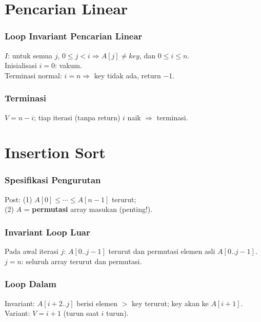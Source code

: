 \documentclass[handout]{beamer}
\theoremstyle{definition}
\theoremstyle{example}
\begin{document}
\section{Pencarian Linear}

\begin{frame}
\frametitle{Loop Invariant Pencarian Linear}
$I$: untuk semua $j$, $0 \leq j < i \Rightarrow A[j] \neq key$, dan $0 \leq i \leq n$.\\
Inisialisasi $i=0$: vakum.\\
Terminasi normal: $i=n \Rightarrow$ key tidak ada, return $-1$.
\end{frame}

\begin{frame}
\frametitle{Terminasi}
$V = n - i$; tiap iterasi (tanpa return) $i$ naik $\Rightarrow$ terminasi.
\end{frame}

\section{Insertion Sort}

\begin{frame}
\frametitle{Spesifikasi Pengurutan}
Post: (1) $A[0] \leq \cdots \leq A[n-1]$ terurut;\\
(2) $A$ = \textbf{permutasi} array masukan (penting!).
\end{frame}

\begin{frame}
\frametitle{Invariant Loop Luar}
Pada awal iterasi $j$: $A[0..j-1]$ terurut dan permutasi elemen asli $A[0..j-1]$.\\
$j=n$: seluruh array terurut dan permutasi.
\end{frame}

\begin{frame}
\frametitle{Loop Dalam}
Invariant: $A[i+2..j]$ berisi elemen $>$ key terurut; key akan ke $A[i+1]$.\\
Variant: $V = i + 1$ (turun saat $i$ turun).
\end{frame}

\end{document}
